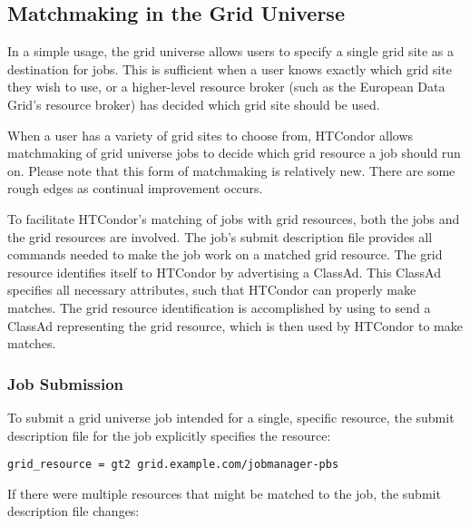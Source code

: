\subsection{\label{sec:Grid-Matchmaking}Matchmaking in the Grid Universe}

In a simple usage, the grid universe allows users to specify a single
grid site as a destination for jobs.
This is sufficient when a user knows exactly which
grid site they wish to use,
or a higher-level resource broker
(such as the European Data Grid's resource broker)
has decided which grid site should be used.

When a user has a variety of grid sites to choose from,
HTCondor allows matchmaking of grid universe jobs
to decide which grid resource a job should run on. 
Please note that this form of matchmaking is relatively new.
There are some rough edges as continual improvement occurs.

To facilitate HTCondor's matching of jobs with grid resources,
both the jobs and the grid resources are involved.
The job's submit description file provides all commands
needed to make the
job work on a matched grid resource.
The grid resource identifies itself to HTCondor by advertising
a ClassAd.
This ClassAd specifies all necessary attributes, such that HTCondor
can properly make matches.
The grid resource identification is accomplished by 
using  to send a ClassAd representing the
grid resource, which is then used by HTCondor to make matches.

\subsubsection{Job Submission}

To submit a grid universe job intended for a single, specific
 resource,
the submit description file for the job explicitly specifies
the resource:

\footnotesize
\begin{verbatim}
grid_resource = gt2 grid.example.com/jobmanager-pbs
\end{verbatim}
\normalsize

If there were multiple  resources that
might be matched to the job,
the submit description file changes:

